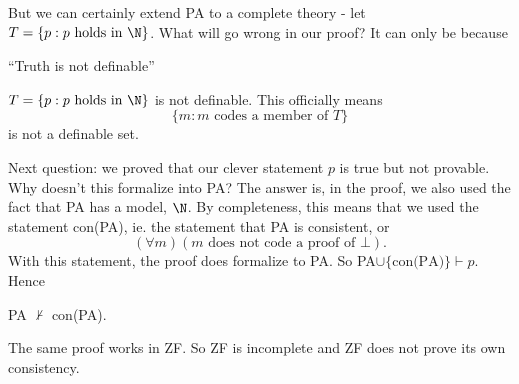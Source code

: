 \documentclass[a4paper]{article}
\begin{document}
But we can certainly extend PA to a complete theory - let $T = \{p: p\text{ holds in }\N\}$. What will go wrong in our proof? It can only be because
\begin{thm}
  ``Truth is not definable''

  $T= \{p: p\text{ holds in }\N\}$ is not definable. This officially means 
  \[
    \{m: m\text{ codes a member of }T\}
  \]
  is not a definable set.
\end{thm}

Next question: we proved that our clever statement $p$ is true but not provable. Why doesn't this formalize into PA? The answer is, in the proof, we also used the fact that PA has a model, $\N$. By completeness, this means that we used the statement con(PA), ie. the statement that PA is consistent, or
\[
  (\forall m)(m\text{ does not code a proof of }\bot).
\]
With this statement, the proof does formalize to PA. So PA$\cup \{\text{con(PA)}\}\vdash p$. Hence
\begin{thm}[]
  PA $\not \vdash$ con(PA).
\end{thm}

The same proof works in ZF. So ZF is incomplete and ZF does not prove its own consistency.
\end{document}
